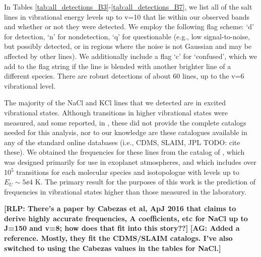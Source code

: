\documentclass[twocolumn]{aastex62}
\newcommand{\rlp}[1]{\textcolor{blue!65!black}{\textbf{[RLP: #1]}}}
\newcommand{\ag}[1]{\textcolor{red!65!black}{\textbf{[AG: #1]}}}
\begin{document}
In Tables \ref{tab:all_detections_B3}-\ref{tab:all_detections_B7}, we list
all of the salt lines in vibrational energy levels up to v=10 that lie within our observed bands
and whether or not they were
detected.  We employ the following
flag scheme:
`d' for detection, `n' for nondetection, `q' for questionable (e.g., low
signal-to-noise, but possibly detected, or in regions where the noise is
not Gaussian and may be affected by other lines).
We additionally include a flag `c' for `confused', which we add to the flag
string if the line is blended with another brighter line of a different species.
There are robust detections of about 60 lines, up to the v=6 vibrational level.

The majority of the NaCl and KCl lines that we detected are in excited vibrational states.
Although transitions in higher vibrational states were measured, and some
reported, in \citet{Caris2004a}, these did not provide
the complete catalogs needed for this analysis, nor to our knowledge are these
catalogues available in any of the standard online databases (i.e., CDMS,
SLAIM, JPL {\color{red}TODO: cite these}). 
We obtained the frequencies for these lines from the catalog of \citet{Barton2014a},
which was designed primarily for use in exoplanet
atmospheres, and which includes over 10$^5$ transitions for each
molecular species and isotopologue with levels up to $E_U\sim5\ee{4}$ K. The
primary result for the purposes of this work is the prediction of frequencies
in vibrational states higher than those measured in the laboratory. 



\rlp{There's a paper by Cabezas et al, ApJ 2016 that claims to derive highly
accurate frequencies, A coefficients, etc for NaCl up to J=150 and v=8; how
does that fit into this story??}
\ag{Added a reference.  Mostly, they fit the CDMS/SLAIM catalogs.  I've also switched
to using the Cabezas values in the tables for NaCl.}
\end{document}

